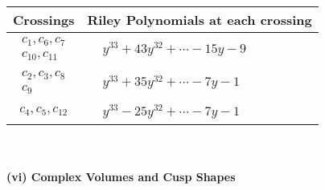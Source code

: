 \documentclass[1p]{elsarticle_modified}
\theoremstyle{definition}
\begin{document}
\begin{tabular}{m{50pt}|m{274pt}}
Crossings & \hspace{64pt}Riley Polynomials at each crossing \\
\hline $$\begin{aligned}c_{1},c_{6},c_{7}\\c_{10},c_{11}\end{aligned}$$&$\begin{aligned}
&y^{33}+43 y^{32}+\cdots-15 y-9
\end{aligned}$\\
\hline $$\begin{aligned}c_{2},c_{3},c_{8}\\c_{9}\end{aligned}$$&$\begin{aligned}
&y^{33}+35 y^{32}+\cdots-7 y-1
\end{aligned}$\\
\hline $$\begin{aligned}c_{4},c_{5},c_{12}\end{aligned}$$&$\begin{aligned}
&y^{33}-25 y^{32}+\cdots-7 y-1
\end{aligned}$\\
\hline
\end{tabular}\\~\\
\newpage\flushleft \textbf{(vi) Complex Volumes and Cusp Shapes}
\end{document}
